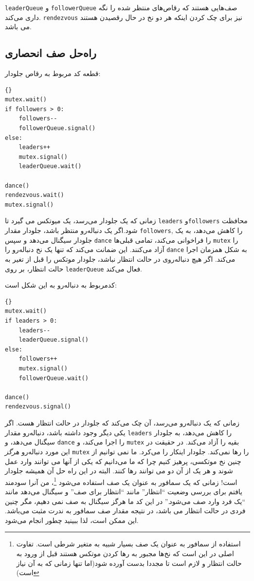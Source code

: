 \documentclass{book}
\newcommand{\clearemptydoublepage}{\newpage\cleardoublepage}
\begin{document}
{\tt leaderQueue} و {\tt followerQueue}
صف‌هایی هستند که رقاص‌های منتظر شده را نگه داری می‌کند. {\tt rendezvous} نیز برای چک کردن اینکه هر دو نخ در حال رقصیدن هستند می باشد.



\clearemptydoublepage
\subsection {راه‌حل صف انحصاری}

قطعه کد مربوط به رقاص جلو‌دار:

\begin{lstlisting}[title={Queue solution (leaders)}]{}
mutex.wait()
if followers > 0:
    followers--
    followerQueue.signal()
else:
    leaders++
    mutex.signal()
    leaderQueue.wait()    

dance()
rendezvous.wait()
mutex.signal()
\end{lstlisting}

زمانی که یک جلو‌دار می‌رسد، یک میوتکس می گیرد تا {\tt leaders} و{\tt followers} محافظت شود.اگر یک دنباله‌رو منتظر باشد، جلو‌دار مقدار {\tt followers}, را کاهش می‌دهد،  به یک جلو‌دار سیگنال می‌دهد و سپس {\tt dance} را فراخوانی می‌کند، تمامی قبلی‌ها {\tt mutex} را آزاد می‌کنند. این ضمانت می‌کند که تنها یک نخ دنباله‌رو را {\tt dance} به شکل همزمان اجرا می‌کند.
اگر هیچ دنباله‌روی در حالت انتظار نباشد، جلو‌دار موتکس را قبل از تغیر به حالت انتظار، بر روی {\tt leaderQueue} فعال می‌کند.

کدمربوط به دنباله‌رو به این شکل است:

\begin{lstlisting}[title={Queue solution (followers)}]{}
mutex.wait()
if leaders > 0:
    leaders--
    leaderQueue.signal()
else:
    followers++
    mutex.signal()
    followerQueue.wait()    

dance()
rendezvous.signal()
\end{lstlisting}
زمانی که یک دنباله‌رو می‌رسد، آن چک می‌کند که جلو‌دار در حالت انتظار هست. اگر یکی دیگر وجود داشته باشد، دنباله‌رو مقدار {\tt leaders} را کاهش می‌دهد، به جلودار سیگنال می‌دهد، و {\tt dance} را اجرا می‌کند، و {\tt mutex} بقیه را آزاد می‌کند. در حقیقت در این مورد دنباله‌رو {\em هرگز} {\tt mutex} را رها نمی‌کند. جلو‌دار اینکار را می‌کرد. ما نمی توانیم از چنین نخ موتکسی، پرهیز کنیم چرا که ما می‌دانیم که یکی از آنها می توانند وارد عمل شوند و هر یک از آن دو می توانند رها کنند. البته در این راه حل آن همیشه جلو‌دار است!
زمانی که یک سمافور به عنوان یک صف استفاده می‌شود
\footnote{استفاده از سمافور به عنوان یک صف بسیار شبیه به متغیر شرطی است. تفاوت اصلی در این است که نخ‌ها مجبور به رها کردن موتکس هستند قبل از ورود به حالت انتظار و لازم است تا مجددا بدست آورده شود(اما تنها زمانی که به آن نیاز است)}،
من آنرا سودمند یافتم برای بررسی وضعیت ``انتظار'' مانند ``انتظار برای صف'' و سیگنال می‌دهد مانند ``یک فرد وارد صف می‌شود.''
در این کد ما هرگز سیگنال به صف نمی دهیم، مگر چنین فردی در حالت انتظار می باشد، در نتیجه مقدار صف سمافور‌ به ندرت مثبت می‌باشد. این ممکن است، لذا ببینید چطور انجام می‌شود.
\end{document}

